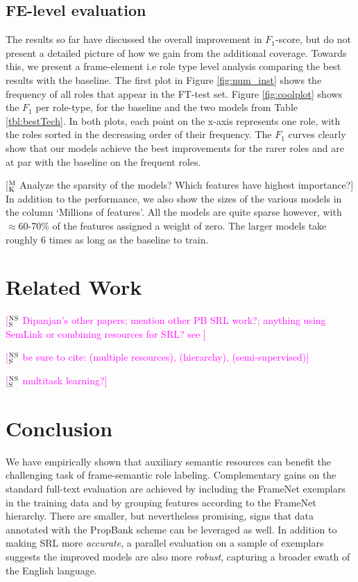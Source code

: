 \documentclass[11pt,a4paper]{article}
\newcommand{\ensuretext}[1]{#1}
\newcommand{\nssmarker}{\ensuretext{\textcolor{magenta}{\ensuremath{^{\textsc{NS}}_{\textsc{S}}}}}}
\newcommand{\mkmarker}{\ensuretext{\textcolor{mdgreen}{\ensuremath{^{\textsc{M}}_{\textsc{K}}}}}}
\newcommand{\arkcomment}[3]{\ensuretext{\textcolor{#3}{[#1 #2]}}}
\newcommand{\nss}[1]{\arkcomment{\nssmarker}{#1}{magenta}}
\newcommand{\mk}[1]{\arkcomment{\mkmarker}{#1}{mdgreen}}
\begin{document}
\subsection{FE-level evaluation}
The results so far have discussed the overall improvement in $F_1$-score, but do not present a detailed picture of how we gain from the additional
coverage. Towards this, we present a frame-element i.e role type level analysis comparing the best results with the baseline.
The first plot in Figure \ref{fig:num_inst} shows the frequency of all roles that appear in the FT-test set.
Figure \ref{fig:coolplot} shows the $F_1$ per role-type, for the baseline and the two models from Table \ref{tbl:bestTech}.
In both plots, each point on the x-axis represents one role, with the roles sorted in the decreasing order of their frequency.
The $F_1$ curves clearly show that our models achieve the best improvements for the rarer roles and are at par with the baseline on the frequent roles.

\mk{Analyze the sparsity of the models? Which features have highest importance?}
In addition to the performance, we also show the sizes of the various models in the column `Millions of features'.
All the models are quite sparse however,
with $\approx$60-70\% of the features assigned a weight of zero.
The larger models take roughly 6 times as long as the baseline to train. 


\section{Related Work}

\nss{Dipanjan's other papers; mention other PB SRL work?; anything using SemLink or combining resources for SRL? see \citep[\S4]{bonial-13}}

\nss{be sure to cite: \citep{shi-05} (multiple resources), \citep{matsubayashi-09} (hierarchy), \citep{furstenau-09} (semi-supervised)}

\nss{multitask learning?}

\section{Conclusion}

We have empirically shown that auxiliary semantic resources
can benefit the challenging task of frame-semantic role labeling.
Complementary gains on the standard full-text evaluation are achieved
by including the FrameNet exemplars in the training data 
and by grouping features according to the FrameNet hierarchy. 
There are smaller, but nevertheless promising, signs that data annotated 
with the PropBank scheme can be leveraged as well.
In addition to making SRL more \emph{accurate}, 
a parallel evaluation on a sample of exemplars suggests the 
improved models are also more \emph{robust}, 
capturing a broader swath of the English language.
\end{document}
